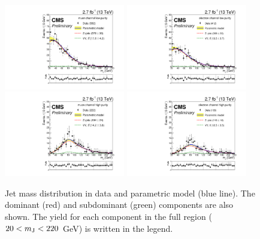 \begin{figure}[p]
\begin{center}
\includegraphics[width=0.47\textwidth]{figures/fits/mjFitMLP.pdf}
\includegraphics[width=0.47\textwidth]{figures/fits/mjFitELP.pdf}\\
\includegraphics[width=0.47\textwidth]{figures/fits/mjFitMHP.pdf}
\includegraphics[width=0.47\textwidth]{figures/fits/mjFitEHP.pdf}
\caption[Jet mass distribution]{Jet mass distribution in data and parametric model (blue line). The dominant (red) and subdominant (green) components are also shown. The yield for each component in the full region ($20 < m_\mathrm{J} < 220$ GeV) is written in the legend.}
\label{mjFit_VZ}
\end{center}
\end{figure}

